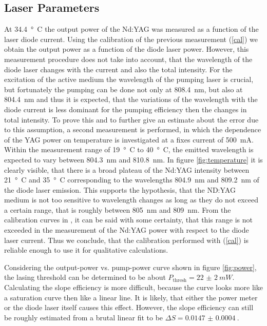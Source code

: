 \documentclass[a4paper]{scrartcl}
\numberwithin{equation}{section}
\numberwithin{figure}{section}
\numberwithin{table}{section}
\newcommand{\Formel}[1]{(\ref{#1})}
\begin{document}
\subsection{Laser Parameters}
At \SI{34.4}{\degree C} the output power of the Nd:YAG was measured as a function of the laser diode current. Using the calibration of the previous measurement \Formel{cal} we obtain the output power as a function of the diode laser power. However, this measurement procedure does not take into account, that the wavelength of the diode laser changes with the current and also the total intensity. For the excitation of the active medium the wavelength of the pumping laser is crucial, but fortunately the pumping can be done not only at \SI{808.4}{nm}, but also at \SI{804.4}{nm} and thus it is expected, that the variations of the wavelength with the diode current is less dominant for the pumping efficiency then the changes in total intensity. To prove this and to further give an estimate about the error due to this assumption, a second measurement is performed, in which the dependence of the YAG power on temperature is investigated at a fixes current of \SI{500}{mA}. Within the measurement range of \SI{19}{ \degree C} to \SI{40}{\degree  C}, the emitted wavelength is expected to vary between \SI{804.3}{nm} and \SI{810.8}{nm}. In figure \ref{fig:temperature} it is clearly visible, that there is a broad plateau of the Nd:YAG intensity between \SI{21}{\degree C} and \SI{35}{\degree C} corresponding to the wavelengths \SI{804.9}{nm} and \SI{809.2}{nm} of the diode laser emission. This supports the hypothesis, that the ND:YAG medium is not too sensitive to wavelength changes as long as they do not exceed a certain range, that is roughly between \SI{805}{nm} and \SI{809}{nm}. From the calibration curves in \cite{script}, it can be said with some certainty, that this range is not exceeded in the measurement of the Nd:YAG power with respect to the diode laser current. Thus we conclude, that the calibration performed with \Formel{cal} is reliable enough to use it for qualitative calculations.

Considering the output-power vs. pump-power curve shown in figure \ref{fig:power}, the lasing threshold can be determined to be about $P_\text{thresh}=\SI{22(2)}{mW}$. Calculating the slope efficiency is more difficult, because the curve looks more like a saturation curve then like a linear line. It is likely, that either the power meter or the diode laser itself causes this effect. However, the slope efficiency can still be roughly estimated from a brutal linear fit to be $\Delta S = \SI{0.0147(4)}{}$.
\end{document}
